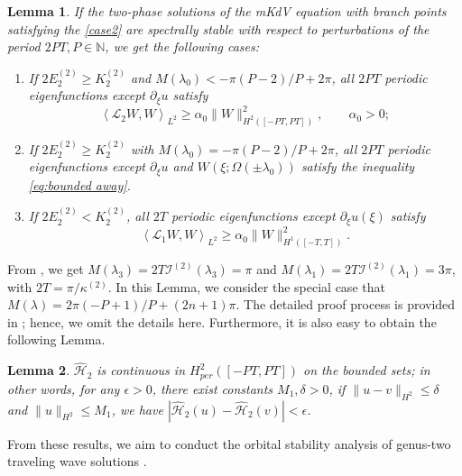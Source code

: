\documentclass[11pt,reqno]{amsart}
\newtheorem{lemma}{Lemma}
\numberwithin{equation}{section}
\begin{document}
\begin{lemma}\label{lemma:alpha-0}
	If the two-phase solutions of the mKdV equation with branch points satisfying the \ref{case2} are spectrally stable with respect to perturbations of the period $2PT, P\in \mathbb{N}$, we get the following cases:
	\begin{enumerate}
		\item[\rm (a)] If $2 E^{(2)}_2\ge  K^{(2)}_2$ and $M(\lambda_0)<-\pi(P-2)/P+2\pi$, all $2PT$ periodic eigenfunctions except $\partial_{\xi}u$ satisfy 
		\begin{equation}\label{eq:bounded away}
			\left\langle \mathcal{L}_2 W, W \right\rangle_{L^2}\ge \alpha_0 \|W\|_{H^2([-PT,PT])}^2, \qquad \alpha_0>0;
		\end{equation} 
		\item[\rm(b)] If $2 E^{(2)}_2\ge  K^{(2)}_2$ with $M(\lambda_0)=-\pi(P-2)/P+2\pi$, all $2PT$ periodic eigenfunctions except $\partial_{\xi}u$ and $W(\xi; \Omega(\pm \lambda_0))$ satisfy the inequality \eqref{eq:bounded away}.	
		\item[\rm(c)] If $2 E^{(2)}_2<  K^{(2)}_2$, all $2T$ periodic eigenfunctions except $\partial_{\xi}u(\xi)$ satisfy
		\begin{equation}\label{eq:bounded away-1}
			\left\langle \mathcal{L}_1 W, W \right\rangle_{L^2} \ge \alpha_0 \|W\|_{H^1([-T,T])}^2.
		\end{equation} 
	\end{enumerate}
\end{lemma}

From , we get $M(\lambda_3)=2T\mathcal{I}^{(2)}(\lambda_3)=\pi$ and $M(\lambda_1)=2T\mathcal{I}^{(2)}(\lambda_1)=3\pi$, with $2T=\pi/\kappa^{(2)}$. 
In this Lemma, we consider the special case that $M(\lambda)=2\pi(-P+1)/P+(2n+1)\pi$.
The detailed proof process is provided in \cite{LingS-23-mKdV-stability}; hence, we omit the details here.
Furthermore, it is also easy to obtain the following Lemma.

\begin{lemma}\label{lemma:H<u}
	$\hat{\mathcal{H}}_2$ is continuous in $H^2_{per}([-PT,PT])$ on the bounded sets; in other words, for any $\epsilon>0$, there exist constants $M_1,\delta>0$, if $\| u-v\|_{H^2}\le\delta$ and $\| u\|_{H^2}\le M_1$, we have $|\hat{\mathcal{H}}_2(u)-\hat{\mathcal{H}}_2(v)|<\epsilon$.
\end{lemma}

From these results, we aim to conduct the orbital stability analysis of genus-two traveling wave solutions .
\end{document}
